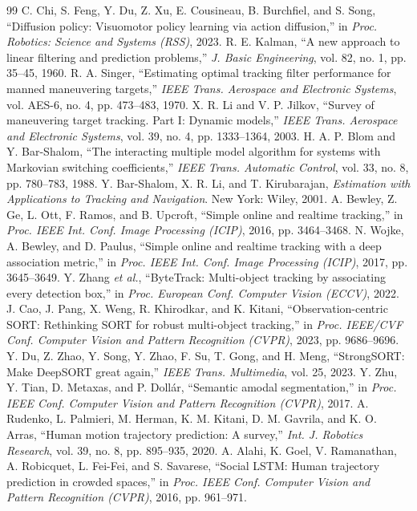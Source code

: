 \documentclass[12pt,a4paper]{article}
\begin{document}
\begin{thebibliography}{99}
 C. Chi, S. Feng, Y. Du, Z. Xu, E. Cousineau, B. Burchfiel, and S. Song, ``Diffusion policy: Visuomotor policy learning via action diffusion,'' in \emph{Proc. Robotics: Science and Systems (RSS)}, 2023.
 R. E. Kalman, ``A new approach to linear filtering and prediction problems,'' \emph{J. Basic Engineering}, vol. 82, no. 1, pp. 35–45, 1960.
 R. A. Singer, ``Estimating optimal tracking filter performance for manned maneuvering targets,'' \emph{IEEE Trans. Aerospace and Electronic Systems}, vol. AES-6, no. 4, pp. 473–483, 1970.
 X. R. Li and V. P. Jilkov, ``Survey of maneuvering target tracking. Part I: Dynamic models,'' \emph{IEEE Trans. Aerospace and Electronic Systems}, vol. 39, no. 4, pp. 1333–1364, 2003.
 H. A. P. Blom and Y. Bar-Shalom, ``The interacting multiple model algorithm for systems with Markovian switching coefficients,'' \emph{IEEE Trans. Automatic Control}, vol. 33, no. 8, pp. 780–783, 1988.
 Y. Bar-Shalom, X. R. Li, and T. Kirubarajan, \emph{Estimation with Applications to Tracking and Navigation}. New York: Wiley, 2001.
 A. Bewley, Z. Ge, L. Ott, F. Ramos, and B. Upcroft, ``Simple online and realtime tracking,'' in \emph{Proc. IEEE Int. Conf. Image Processing (ICIP)}, 2016, pp. 3464–3468.
 N. Wojke, A. Bewley, and D. Paulus, ``Simple online and realtime tracking with a deep association metric,'' in \emph{Proc. IEEE Int. Conf. Image Processing (ICIP)}, 2017, pp. 3645–3649.
 Y. Zhang \emph{et al.}, ``ByteTrack: Multi-object tracking by associating every detection box,'' in \emph{Proc. European Conf. Computer Vision (ECCV)}, 2022.
 J. Cao, J. Pang, X. Weng, R. Khirodkar, and K. Kitani, ``Observation-centric SORT: Rethinking SORT for robust multi-object tracking,'' in \emph{Proc. IEEE/CVF Conf. Computer Vision and Pattern Recognition (CVPR)}, 2023, pp. 9686–9696.
 Y. Du, Z. Zhao, Y. Song, Y. Zhao, F. Su, T. Gong, and H. Meng, ``StrongSORT: Make DeepSORT great again,'' \emph{IEEE Trans. Multimedia}, vol. 25, 2023.
 Y. Zhu, Y. Tian, D. Metaxas, and P. Dollár, ``Semantic amodal segmentation,'' in \emph{Proc. IEEE Conf. Computer Vision and Pattern Recognition (CVPR)}, 2017.
 A. Rudenko, L. Palmieri, M. Herman, K. M. Kitani, D. M. Gavrila, and K. O. Arras, ``Human motion trajectory prediction: A survey,'' \emph{Int. J. Robotics Research}, vol. 39, no. 8, pp. 895–935, 2020.
 A. Alahi, K. Goel, V. Ramanathan, A. Robicquet, L. Fei-Fei, and S. Savarese, ``Social LSTM: Human trajectory prediction in crowded spaces,'' in \emph{Proc. IEEE Conf. Computer Vision and Pattern Recognition (CVPR)}, 2016, pp. 961–971.

\end{thebibliography}
\end{document}
